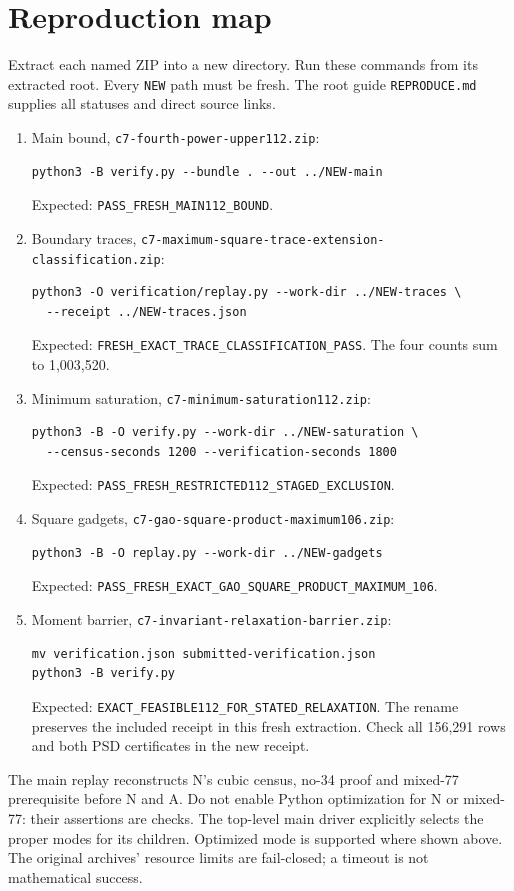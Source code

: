 \documentclass[11pt]{article}
\theoremstyle{definition}
\begin{document}
\section{Reproduction map}\label{app:replay}
Extract each named ZIP into a new directory. Run these commands from its
extracted root. Every \texttt{NEW} path must be fresh. The root guide
\texttt{REPRODUCE.md} supplies all statuses and direct source links.
\begin{enumerate}\small\raggedright
\item Main bound, \nolinkurl{c7-fourth-power-upper112.zip}:
\begin{verbatim}
python3 -B verify.py --bundle . --out ../NEW-main
\end{verbatim}
Expected: \nolinkurl{PASS_FRESH_MAIN112_BOUND}.
\item Boundary traces,
\nolinkurl{c7-maximum-square-trace-extension-classification.zip}:
\begin{verbatim}
python3 -O verification/replay.py --work-dir ../NEW-traces \
  --receipt ../NEW-traces.json
\end{verbatim}
Expected: \nolinkurl{FRESH_EXACT_TRACE_CLASSIFICATION_PASS}.
The four counts sum to 1,003,520.
\item Minimum saturation, \nolinkurl{c7-minimum-saturation112.zip}:
\begin{verbatim}
python3 -B -O verify.py --work-dir ../NEW-saturation \
  --census-seconds 1200 --verification-seconds 1800
\end{verbatim}
Expected: \nolinkurl{PASS_FRESH_RESTRICTED112_STAGED_EXCLUSION}.
\item Square gadgets, \nolinkurl{c7-gao-square-product-maximum106.zip}:
\begin{verbatim}
python3 -B -O replay.py --work-dir ../NEW-gadgets
\end{verbatim}
Expected: \nolinkurl{PASS_FRESH_EXACT_GAO_SQUARE_PRODUCT_MAXIMUM_106}.
\item Moment barrier, \nolinkurl{c7-invariant-relaxation-barrier.zip}:
\begin{verbatim}
mv verification.json submitted-verification.json
python3 -B verify.py
\end{verbatim}
Expected: \nolinkurl{EXACT_FEASIBLE112_FOR_STATED_RELAXATION}.
The rename preserves the included receipt in this fresh extraction.
Check all 156,291 rows and both PSD certificates in the new receipt.
\end{enumerate}
The main replay reconstructs N's cubic census, no-34 proof and mixed-77
prerequisite before N and A. Do not enable Python optimization for N or
mixed-77: their assertions are checks. The top-level main driver explicitly
selects the proper modes for its children. Optimized mode is supported
where shown above. The original archives' resource limits are fail-closed;
a timeout is not mathematical success.
\end{document}
